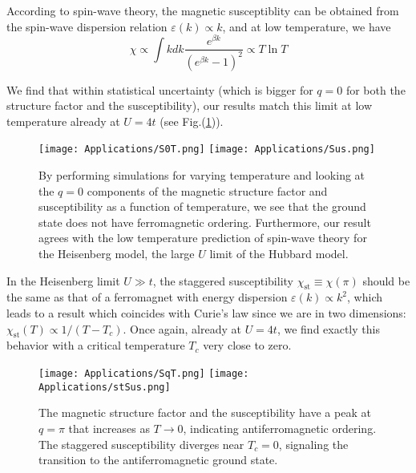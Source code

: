 According to spin-wave theory, the magnetic susceptiblity can be obtained from the spin-wave dispersion relation $\varepsilon ( k ) \propto k$, and at low temperature, we have
\begin{equation}
\chi \propto \int k dk \frac{e^{\beta k}}{(e^{\beta k} -1)^2} \propto T \ln T
\end{equation}

We find that within statistical uncertainty (which is bigger for $q=0$ for both the structure factor and the susceptibility), our results match this limit at low temperature already at $U = 4t$ (see Fig.(\ref{fig:Schi0})).
\begin{figure}[H]
\texttt{[image: Applications/S0T.png]}
\hspace{-0.5cm}
\texttt{[image: Applications/Sus.png]}
\caption[$q=0$ components of the magnetic structure factor and susceptibility as a function of temperature, indicating that the ground state does not have ferromagnetic ordering.]{By performing simulations for varying temperature and looking at the $q=0$ components of the magnetic structure factor and susceptibility as a function of temperature, we see that the ground state does not have ferromagnetic ordering.
Furthermore, our result agrees with the low temperature prediction of spin-wave theory for the Heisenberg model, the large $U$ limit of the Hubbard model.\label{fig:Schi0}}
\end{figure}
In the Heisenberg limit $U \gg t$, the staggered susceptibility $\chi_{\text{st}} \equiv \chi (\pi)$ should be the same as that of a ferromagnet with energy dispersion $\varepsilon (k )\propto k^2$, which leads to a result which coincides with Curie's law since we are in two dimensions: $\chi_{\text{st}} ( T ) \propto 1 / (T - T_c) $.
Once again, already at $U = 4 t$, we find exactly this behavior with a critical temperature $T_c$ very close to zero.
\begin{figure}[H]\label{fig:SchiPi}
\texttt{[image: Applications/SqT.png]}
\hspace{-0.5cm}
\texttt{[image: Applications/stSus.png]}
\caption[The magnetic structure factor and the  susceptibility have a peak at $q = \pi$ that increases as $T\rightarrow 0$, indicating \emph{antiferromagnetic ordering}.
 Divergence of the staggered susceptibility near $T_c = 0$, signaling the transition to the antiferromagnetic ground state.]{The magnetic structure factor and the susceptibility have a peak at $q = \pi$ that increases as $T\rightarrow 0$, indicating antiferromagnetic ordering.
The staggered susceptibility diverges near $T_c = 0$, signaling the transition to the antiferromagnetic ground state.}
\end{figure}

